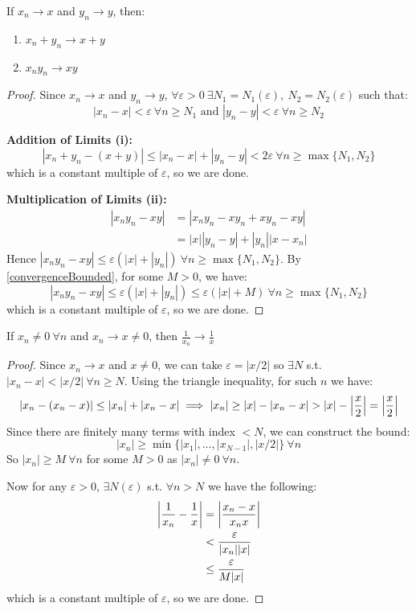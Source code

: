 \documentclass[../main.tex]{subfiles}
\begin{document}
\begin{lemma}
  If $x_n \to x$ and $y_n \to y$, then:
  \label{sequenceLimitLaws}
  \begin{enumerate}
    \item $x_n + y_n \to x + y$
    \item $x_n y_n \to xy$
  \end{enumerate}
\end{lemma}
\begin{proof}
  Since $x_n \to x$ and $y_n \to y$, $\forall \varepsilon > 0\ \exists N_1 = N_1 (\varepsilon),\ N_2 = N_2(\varepsilon)$ such that:
  \[
    |x_n - x| < \varepsilon\ \forall n \geq N_1 \text{ and } |y_n - y| < \varepsilon\ \forall n \geq N_2
  \]

  \textbf{Addition of Limits (i):}
  \[
    |x_n + y_n - (x + y)| \leq |x_n - x| + |y_n - y| < 2\varepsilon\ \forall n \geq \max\{N_1, N_2\}
  \]
  which is a constant multiple of $\varepsilon$, so we are done.

  \textbf{Multiplication of Limits (ii):}
  \begin{align*}
    |x_n y_n - xy| &= |x_n y_n - xy_n + xy_n - xy| \\
                   &= |x| |y_n - y| + |y_n||x - x_n|
  \end{align*}
  Hence $|x_n y_n - xy| \leq \varepsilon(|x| + |y_n|)\ \forall n \geq \max\{N_1, N_2\}$.
  By \cref{convergenceBounded}, for some $M > 0$, we have:
  \[
    |x_ny_n - xy| \leq \varepsilon(|x| + |y_n|) \leq \varepsilon(|x| + M)\ \forall n \geq \max\{N_1, N_2\}
  \]
  which is a constant multiple of $\varepsilon$, so we are done.
\end{proof}
\begin{lemma}
  If $x_n \neq 0\ \forall n$ and $x_n \to x \neq 0$, then $\frac{1}{x_n} \to \frac{1}{x}$
  \label{reciprocalConvergence}
\end{lemma}
\begin{proof}
  Since $x_n \to x$ and $x \neq 0$, we can take $\varepsilon = |x/2|$ so $\exists N$ s.t. $|x_n - x| < |x/2|\ \forall n \geq N$.
  Using the triangle inequality, for such $n$ we have:
  \[
    |x_n - (x_n - x)| \leq |x_n| + |x_n - x| \implies |x_n| \geq |x| - |x_n - x| > |x| - \left\lvert \frac{x}{2} \right\rvert = \left\lvert \frac{x}{2} \right\rvert
  \]
  Since there are finitely many terms with index $< N$, we can construct the bound:
  \[
    |x_n| \geq \min\{|x_1|, \ldots, |x_{N - 1}|, |x/2|\}\ \forall n
  \]
  So $|x_n| \geq M\ \forall n$ for some $M > 0$ as $|x_n| \neq 0\ \forall n$.

  Now for any $\varepsilon > 0$, $\exists N(\varepsilon)$ s.t. $\forall n > N$ we have the following:
  \begin{align*}
    \left\lvert \frac{1}{x_n} - \frac{1}{x} \right\rvert &= \left\lvert \frac{x_n - x}{x_n x} \right\rvert \\
                                      &< \frac{\varepsilon}{|x_n||x|} \\
                                      &\leq \frac{\varepsilon}{M|x|}
  \end{align*}
  which is a constant multiple of $\varepsilon$, so we are done.
\end{proof}
\end{document}
